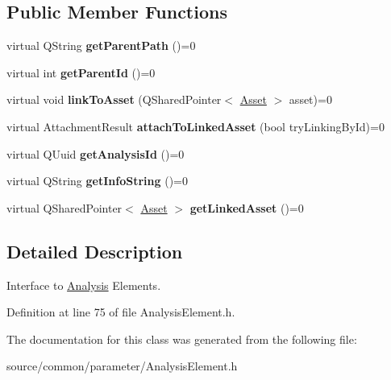 \subsection*{Public Member Functions}
\begin{DoxyCompactItemize}
\item 
\hypertarget{class_picto_1_1_analysis_element_a10faaf899870174050fa8ea8e061a6da}{virtual Q\-String {\bfseries get\-Parent\-Path} ()=0}\label{class_picto_1_1_analysis_element_a10faaf899870174050fa8ea8e061a6da}

\item 
\hypertarget{class_picto_1_1_analysis_element_a411b33aebaa11ccf449576fdd92e0dab}{virtual int {\bfseries get\-Parent\-Id} ()=0}\label{class_picto_1_1_analysis_element_a411b33aebaa11ccf449576fdd92e0dab}

\item 
\hypertarget{class_picto_1_1_analysis_element_a29c42c74aad1a673845cad6da44e43a4}{virtual void {\bfseries link\-To\-Asset} (Q\-Shared\-Pointer$<$ \hyperlink{class_picto_1_1_asset}{Asset} $>$ asset)=0}\label{class_picto_1_1_analysis_element_a29c42c74aad1a673845cad6da44e43a4}

\item 
\hypertarget{class_picto_1_1_analysis_element_a760c2ad80047ec6e875d7837eb5344b4}{virtual Attachment\-Result {\bfseries attach\-To\-Linked\-Asset} (bool try\-Linking\-By\-Id)=0}\label{class_picto_1_1_analysis_element_a760c2ad80047ec6e875d7837eb5344b4}

\item 
\hypertarget{class_picto_1_1_analysis_element_a7e78a8df100edf480fb4753a1e2f0159}{virtual Q\-Uuid {\bfseries get\-Analysis\-Id} ()=0}\label{class_picto_1_1_analysis_element_a7e78a8df100edf480fb4753a1e2f0159}

\item 
\hypertarget{class_picto_1_1_analysis_element_aa09e4afed1eaf34731b4bf12862ab355}{virtual Q\-String {\bfseries get\-Info\-String} ()=0}\label{class_picto_1_1_analysis_element_aa09e4afed1eaf34731b4bf12862ab355}

\item 
\hypertarget{class_picto_1_1_analysis_element_a0b58dd8bc9700b682decaee88dc2123e}{virtual Q\-Shared\-Pointer$<$ \hyperlink{class_picto_1_1_asset}{Asset} $>$ {\bfseries get\-Linked\-Asset} ()=0}\label{class_picto_1_1_analysis_element_a0b58dd8bc9700b682decaee88dc2123e}

\end{DoxyCompactItemize}


\subsection{Detailed Description}
Interface to \hyperlink{class_picto_1_1_analysis}{Analysis} Elements. 



Definition at line 75 of file Analysis\-Element.\-h.



The documentation for this class was generated from the following file\-:\begin{DoxyCompactItemize}
\item 
source/common/parameter/Analysis\-Element.\-h\end{DoxyCompactItemize}

